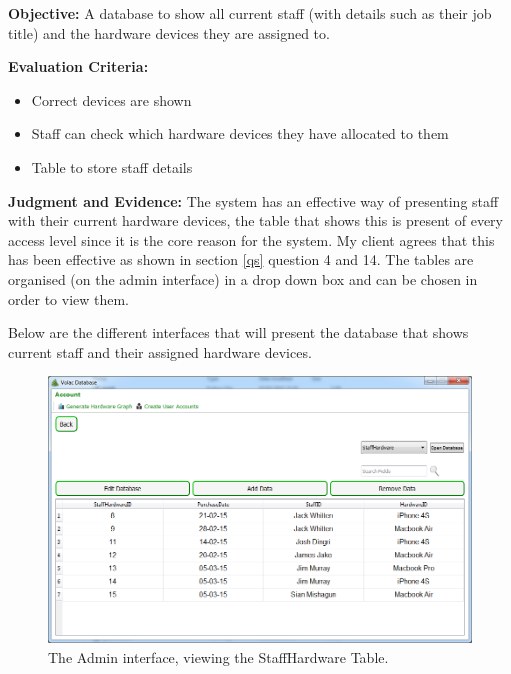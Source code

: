 \textbf{Objective:} A database to show all current staff (with details such as their job title) and the hardware devices they are assigned to.

\textbf{Evaluation Criteria:}
\begin{itemize}
\item{Correct devices are shown}
\item{Staff can check which hardware devices they have allocated to them}
\item{Table to store staff details}
\end{itemize}

\textbf{Judgment and Evidence:}
The system has an effective way of presenting staff with their current hardware devices, the table that shows this is present of every access level since it is the core reason for the system. My client agrees that this has been effective as shown in section \ref{qs} question 4 and 14. The tables are organised (on the admin interface) in a drop down box and can be chosen in order to view them.

Below are the different interfaces that will present the database that shows current staff and their assigned hardware devices.

\begin{figure}[H]
    \includegraphics[width=\textwidth]{./Evaluation/Images/Database1.png}
    \caption{The Admin interface, viewing the StaffHardware Table.} \label{fig:db1}
\end{figure}

